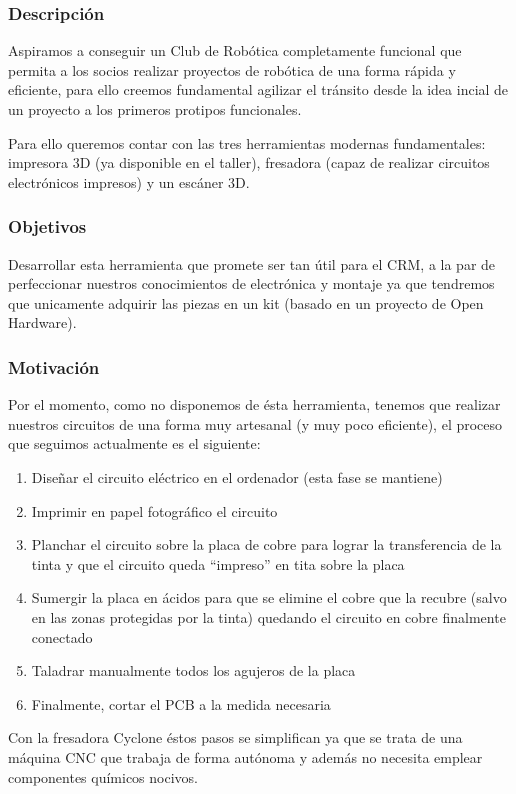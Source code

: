 \documentclass[12pt,twoside]{report}
\begin{document}
\subsubsection{Descripción}
Aspiramos a conseguir un Club de Robótica completamente funcional que permita a los socios realizar proyectos de robótica de una forma rápida y eficiente, para ello creemos fundamental agilizar el tránsito desde la idea incial de un proyecto a los primeros protipos funcionales.

Para ello queremos contar con las tres herramientas modernas fundamentales: impresora 3D (ya disponible en el taller), fresadora (capaz de realizar circuitos electrónicos impresos) y un escáner 3D.

\subsubsection{Objetivos}
Desarrollar esta herramienta que promete ser tan útil para el CRM, a la par de perfeccionar nuestros conocimientos de electrónica y montaje ya que tendremos que unicamente adquirir las piezas en un kit (basado en un proyecto de Open Hardware).

\subsubsection{Motivación}
Por el momento, como no disponemos de ésta herramienta, tenemos que realizar nuestros circuitos de una forma muy artesanal (y muy poco eficiente), el proceso que seguimos actualmente es el siguiente:
\begin{enumerate}
\item Diseñar el circuito eléctrico en el ordenador (esta fase se mantiene)
\item Imprimir en papel fotográfico el circuito
\item Planchar el circuito sobre la placa de cobre para lograr la transferencia de la tinta y que el circuito queda “impreso” en tita sobre la placa
\item Sumergir la placa en ácidos para que se elimine el cobre que la recubre (salvo en las zonas protegidas por la tinta) quedando el circuito en cobre finalmente conectado
\item Taladrar manualmente todos los agujeros de la placa
\item Finalmente, cortar el PCB a la medida necesaria
\end{enumerate}

Con la fresadora Cyclone éstos pasos se simplifican ya que se trata de una máquina CNC que trabaja de forma autónoma y además no necesita emplear componentes químicos nocivos.
\end{document}
